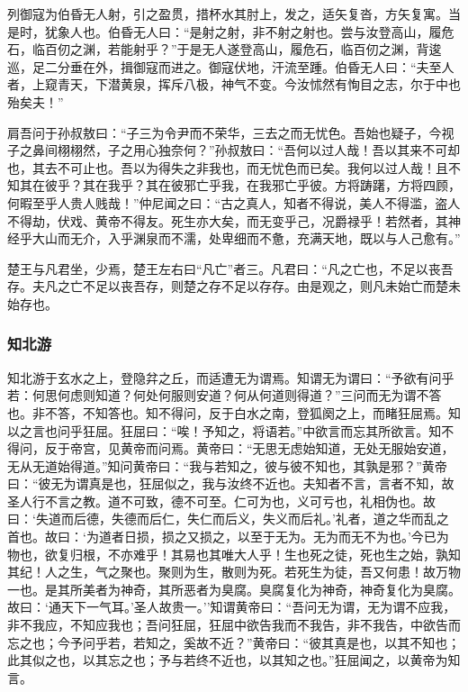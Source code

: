 \documentclass[]{article}
\begin{document}
列御寇为伯昏无人射，引之盈贯，措杯水其肘上，发之，适矢复沓，方矢复寓。当是时，犹象人也。伯昏无人曰：``是射之射，非不射之射也。尝与汝登高山，履危石，临百仞之渊，若能射乎？''于是无人遂登高山，履危石，临百仞之渊，背逡巡，足二分垂在外，揖御寇而进之。御寇伏地，汗流至踵。伯昏无人曰：``夫至人者，上窥青天，下潜黄泉，挥斥八极，神气不变。今汝怵然有恂目之志，尔于中也殆矣夫！''

肩吾问于孙叔敖曰：``子三为令尹而不荣华，三去之而无忧色。吾始也疑子，今视子之鼻间栩栩然，子之用心独奈何？''孙叔敖曰：``吾何以过人哉！吾以其来不可却也，其去不可止也。吾以为得失之非我也，而无忧色而已矣。我何以过人哉！且不知其在彼乎？其在我乎？其在彼邪亡乎我，在我邪亡乎彼。方将踌躇，方将四顾，何暇至乎人贵人贱哉！''仲尼闻之曰：``古之真人，知者不得说，美人不得滥，盗人不得劫，伏戏、黄帝不得友。死生亦大矣，而无变乎己，况爵禄乎！若然者，其神经乎大山而无介，入乎渊泉而不濡，处卑细而不惫，充满天地，既以与人己愈有。''

楚王与凡君坐，少焉，楚王左右曰``凡亡''者三。凡君曰：``凡之亡也，不足以丧吾存。夫凡之亡不足以丧吾存，则楚之存不足以存存。由是观之，则凡未始亡而楚未始存也。

\hypertarget{header-n362}{%
\subsubsection{知北游}\label{header-n362}}

知北游于玄水之上，登隐弅之丘，而适遭无为谓焉。知谓无为谓曰：``予欲有问乎若：何思何虑则知道？何处何服则安道？何从何道则得道？''三问而无为谓不答也。非不答，不知答也。知不得问，反于白水之南，登狐阕之上，而睹狂屈焉。知以之言也问乎狂屈。狂屈曰：``唉！予知之，将语若。''中欲言而忘其所欲言。知不得问，反于帝宫，见黄帝而问焉。黄帝曰：``无思无虑始知道，无处无服始安道，无从无道始得道。''知问黄帝曰：``我与若知之，彼与彼不知也，其孰是邪？''黄帝曰：``彼无为谓真是也，狂屈似之，我与汝终不近也。夫知者不言，言者不知，故圣人行不言之教。道不可致，德不可至。仁可为也，义可亏也，礼相伪也。故曰：`失道而后德，失德而后仁，失仁而后义，失义而后礼。'礼者，道之华而乱之首也。故曰：`为道者日损，损之又损之，以至于无为。无为而无不为也。'今已为物也，欲复归根，不亦难乎！其易也其唯大人乎！生也死之徒，死也生之始，孰知其纪！人之生，气之聚也。聚则为生，散则为死。若死生为徒，吾又何患！故万物一也。是其所美者为神奇，其所恶者为臭腐。臭腐复化为神奇，神奇复化为臭腐。故曰：`通天下一气耳。'圣人故贵一。''知谓黄帝曰：``吾问无为谓，无为谓不应我，非不我应，不知应我也；吾问狂屈，狂屈中欲告我而不我告，非不我告，中欲告而忘之也；今予问乎若，若知之，奚故不近？''黄帝曰：``彼其真是也，以其不知也；此其似之也，以其忘之也；予与若终不近也，以其知之也。''狂屈闻之，以黄帝为知言。
\end{document}
